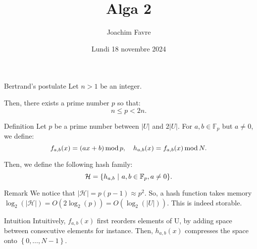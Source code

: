 \documentclass[a4paper]{article}
\title{Alga 2}
\author{Joachim Favre}
\date{Lundi 18 novembre 2024}
\begin{document}
\maketitle


\begin{parag}{Bertrand's postulate}
    Let $n > 1$ be an integer.

    Then, there exists a prime number $p$ so that: 
    \[n \leq p < 2n.\]
\end{parag}

\begin{parag}{Definition}
    Let $p$ be a prime number between $\left|U\right|$ and $2\left|U\right|$. For $a, b \in \mathbb{F}_p$ but $a \neq 0$, we define: 
    \[f_{a, b}\left(x\right) = \left(ax + b\right) \Mod p, \mathspace h_{a, b}\left(x\right) = f_{a, b}\left(x\right) \Mod N.\]
    
   Then, we define the following hash family:  
   \[\mathcal{H} = \left\{h_{a,b} \suchthat a, b \in \mathbb{F}_p, a \neq 0\right\}.\]

   \begin{subparag}{Remark}
       We notice that $\left|\mathcal{H}\right| = p\left(p-1\right) \approx p^2$. So, a hash function takes memory $\log_2\left(\left|\mathcal{H}\right|\right) = O\left(2 \log_2\left(p\right)\right) = O\left(\log_2\left(\left|U\right|\right)\right)$. This is indeed storable.
   \end{subparag}

   \begin{subparag}{Intuition}
       Intuitively, $f_{a, b}\left(x\right)$ first reorders elements of U, by adding space between consecutive elements for instance. Then, $h_{a, b}\left(x\right)$ compresses the space onto $\left\{0, \ldots, N-1\right\}$.
   \end{subparag}
\end{parag}
\end{document}
